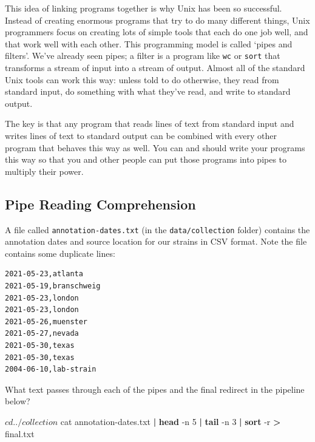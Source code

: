 \documentclass[
]{book}
\newenvironment{Shaded}{\begin{snugshade}}{\end{snugshade}}
\newcommand{\AttributeTok}[1]{\textcolor[rgb]{0.13,0.29,0.53}{#1}}
\newcommand{\ExtensionTok}[1]{#1}
\newcommand{\FunctionTok}[1]{\textcolor[rgb]{0.13,0.29,0.53}{\textbf{#1}}}
\newcommand{\KeywordTok}[1]{\textcolor[rgb]{0.13,0.29,0.53}{\textbf{#1}}}
\newcommand{\NormalTok}[1]{#1}
\newcommand{\OperatorTok}[1]{\textcolor[rgb]{0.81,0.36,0.00}{\textbf{#1}}}
\begin{document}
This idea of linking programs together is why Unix has been so successful. Instead of creating enormous programs that try to do many different things, Unix programmers focus on creating lots of simple tools that each do one job well, and that work well with each other. This programming model is called `pipes and filters'. We've already seen pipes; a filter is a program like \texttt{wc} or \texttt{sort} that transforms a stream of input into a stream of output. Almost all of the standard Unix tools can work this way: unless told to do otherwise, they read from standard input, do something with what they've read, and write to standard output.

The key is that any program that reads lines of text from standard input and writes lines of text to standard output can be combined with every other program that behaves this way as well. You can and should write your programs this way so that you and other people can put those programs into pipes to multiply their power.

\subsection{Pipe Reading Comprehension}\label{pipe-reading-comprehension}

A file called \texttt{annotation-dates.txt} (in the \texttt{data/collection} folder) contains the annotation dates and source location for our strains in CSV format. Note the file contains some duplicate lines:

\begin{verbatim}
2021-05-23,atlanta
2021-05-19,branschweig
2021-05-23,london
2021-05-23,london
2021-05-26,muenster
2021-05-27,nevada
2021-05-30,texas
2021-05-30,texas
2004-06-10,lab-strain
\end{verbatim}

What text passes through each of the pipes and the final redirect in the pipeline below?

\begin{Shaded}
\begin{Highlighting}[]
\ExtensionTok{$}\NormalTok{ cd ../collection}
\ExtensionTok{$}\NormalTok{ cat annotation{-}dates.txt }\KeywordTok{|} \FunctionTok{head} \AttributeTok{{-}n}\NormalTok{ 5 }\KeywordTok{|} \FunctionTok{tail} \AttributeTok{{-}n}\NormalTok{ 3 }\KeywordTok{|} \FunctionTok{sort} \AttributeTok{{-}r} \OperatorTok{\textgreater{}}\NormalTok{ final.txt}
\end{Highlighting}
\end{Shaded}
\end{document}
